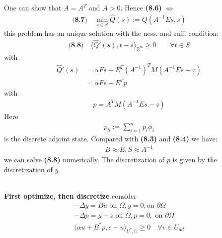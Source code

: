 \documentclass[a4paper,11pt,fleqn]{book}
\theoremstyle{definition}
\theoremstyle{remark}
\begin{document}
One can show that $A = A^T$ and $A > 0$. Hence \textbf{(8.6)} $\Leftrightarrow$
\begin{align*}
\textbf{(8.7)} \quad
	\min_{s \in S} \hat{Q}(s):= Q(A^{-1}Es, s )
\end{align*}
this problem has an unique solution with the ness. and suff. condition:
\begin{align*}
\textbf{(8.8)} \quad
	\langle \hat{Q}'(s), t - s \rangle_{\mathbb{R}^m} \ge 0 \qquad \forall t \in S
\end{align*}
with
\begin{align*}
	\hat{Q}'(s) &= \alpha F s + E^T(A^{-1})^T M(A^{-1} Es - z)\\
	&= \alpha F s + E^T p
\end{align*}
with
\begin{align*}
	p = A^T M (A^{-1} Es - z)
\end{align*}
Here
\begin{align*}
	p_h:= \sum_{i = 1}^n p_i \phi_i 
\end{align*}
is the discrete adjoint state. Compared with \textbf{(8.3)} and \textbf{(8.4)} we have:
\begin{align*}
	B \approx E, S \approx A^{-1}
\end{align*}
we can solve \textbf{(8.8)} numerically. The discretization of $p$ is given by the discretization of $y$

\quad\\
\textbf{First optimize, then discretize}
consider
\begin{align*}
	-\Delta y = Bu \text{ on } \Omega, y = 0, \text{on } \partial \Omega\\
	-\Delta p = y - z \text{ on } \Omega, p = 0, \text{ on } \partial \Omega\\
	\langle \alpha u + B^*p , c - u \rangle_{U^*, U} \geq 0 \quad \forall v 
	\in U_{ad}
\end{align*}
\end{document}
